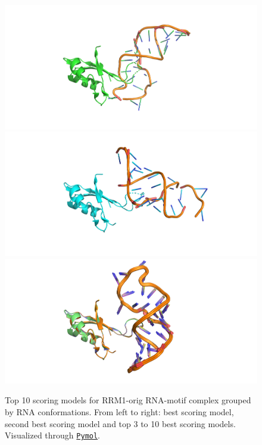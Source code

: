\begin{figure}[htbp!]
    \includegraphics[trim={6.5cm 0 6.5cm 0},clip,width=\linewidth]{assets/RMM1_orig_top0.png}
\endminipage\hfill
{}
    \includegraphics[trim={6.5cm 0 5.5cm 0},clip,width=\linewidth]{assets/RMM1_orig_top1.png}
\endminipage\hfill
{}
    \includegraphics[trim={6.5cm 0 7cm 0},clip,width=\linewidth]{assets/RMM1_orig_2to8.png}
\endminipage
\caption[Top 10 scoring models for RRM1-orig RNA-motif complex grouped by RNA conformations.]{Top 10 scoring models for RRM1-orig RNA-motif complex grouped by RNA conformations. From left to right: best scoring model, second best scoring model and top 3 to 10 best scoring models. Visualized through \href{https://pymol.org/2/}{\texttt{Pymol}}.}
\label{fig:RRMorigSep}
\end{figure}


